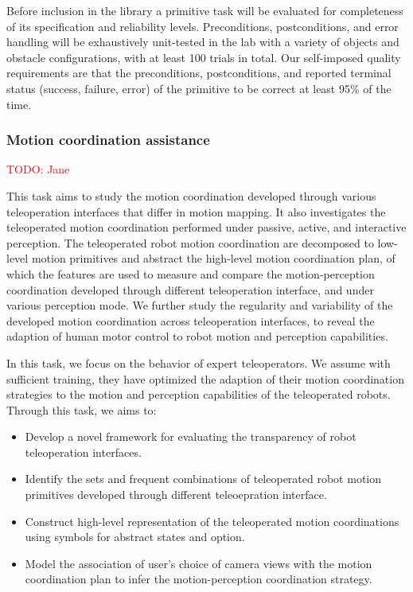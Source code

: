 Before inclusion in the library a primitive task will be evaluated for completeness of its specification and reliability levels.  Preconditions, postconditions, and error handling will be exhaustively unit-tested in the lab with a variety of objects and obstacle configurations, with at least 100 trials in total.  Our self-imposed quality requirements are that the preconditions, postconditions, and reported terminal status (success, failure, error) of the primitive to be correct at least 95\% of the time.



\subsubsection{Motion coordination assistance}
\textcolor{red}{TODO: Jane}

This task aims to study the motion coordination developed through various teleoperation interfaces that differ in motion mapping. It also investigates the teleoperated motion coordination performed under passive, active, and interactive perception. The teleoperated robot motion coordination are decomposed to low-level motion primitives and abstract the high-level motion coordination plan, of which the features are used to measure and compare the motion-perception coordination developed through different teleoperation interface, and under various perception mode. We further study the regularity and variability of the developed motion coordination across teleoperation interfaces, to reveal the adaption of human motor control to robot motion and perception capabilities.

In this task, we focus on the behavior of expert teleoperators. We assume with sufficient training, they have optimized the adaption of their motion coordination strategies to the motion and perception capabilities of the teleoperated robots. Through this task, we aims to:

\begin{itemize}

\item Develop a novel framework for evaluating the transparency of robot teleoperation interfaces. 

\item Identify the sets and frequent combinations of teleoperated robot motion primitives developed through different teleoepration interface. 

\item Construct high-level representation of the teleoperated motion coordinations using symbols for abstract states and option. 

\item Model the association of user's choice of camera views with the motion coordination plan to infer the motion-perception coordination strategy. 

\end{itemize}

